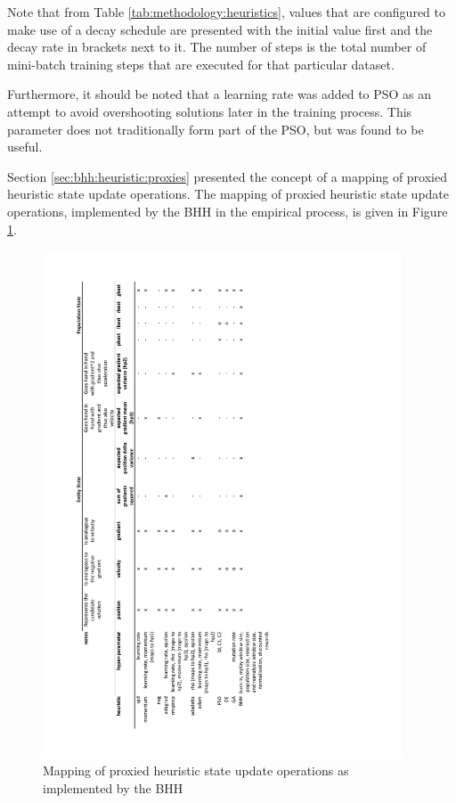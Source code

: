\noindent
Note that from Table \ref{tab:methodology:heuristics}, values that are configured to make use of a decay schedule are presented with the initial value first and the decay rate in brackets next to it. The number of steps is the total number of mini-batch training steps that are executed for that particular dataset.

Furthermore, it should be noted that a learning rate was added to \acs{PSO} as an attempt to avoid overshooting solutions later in the training process. This parameter does not traditionally form part of the \ac{PSO}, but was found to be useful.

Section \ref{sec:bhh:heuristic:proxies} presented the concept of a mapping of proxied heuristic state update operations. The mapping of proxied heuristic state update operations, implemented by the \acs{BHH} in the empirical process, is given in Figure \ref{fig:methodology:heuristics:proxies}.


\begin{figure}[htbp]
      \centering
      \includegraphics[width=0.95\textwidth]{images/bhh_heuristic_proxies.pdf}
      \caption{Mapping of proxied heuristic state update operations as implemented by the \acs{BHH}}
      \label{fig:methodology:heuristics:proxies}%
\end{figure}


